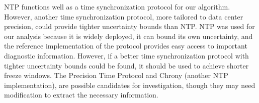 NTP functions well as a time synchronization protocol for our
algorithm.  However, another time synchronization protocol, more
tailored to data center precision, could provide tighter uncertainty
bounds than NTP. NTP was used for our analysis because it is widely
deployed, it can bound its own uncertainty, and the reference
implementation of the protocol provides easy access to important
diagnostic information. However, if a better time synchronization
protocol with tighter uncertainty bounds could be found, it should be
used to achieve shorter freeze windows. The Precision Time Protocol
and Chrony (another NTP implementation), are possible candidates for
investigation, though they may need modification to extract the
necessary information.

